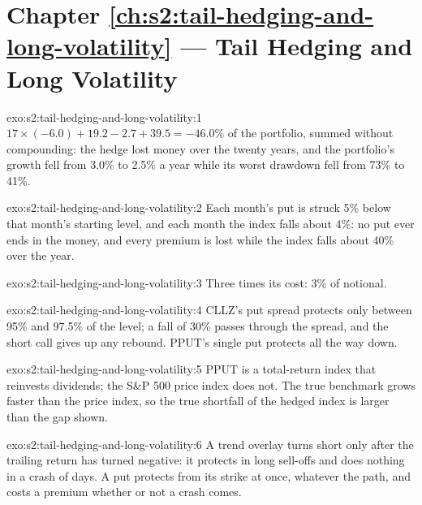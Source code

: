 \section*{Chapter \ref{ch:s2:tail-hedging-and-long-volatility} --- Tail Hedging and Long Volatility}

\begin{solution}{exo:s2:tail-hedging-and-long-volatility:1}
$17 \times (-6.0) + 19.2 - 2.7 + 39.5 = -46.0\%$ of the portfolio, summed without compounding: the hedge lost money over the twenty years, and the
portfolio's growth fell from 3.0\% to 2.5\% a year while its worst drawdown fell from 73\% to 41\%.
\end{solution}

\begin{solution}{exo:s2:tail-hedging-and-long-volatility:2}
Each month's put is struck 5\% below that month's starting level, and each month the index falls about 4\%: no put ever ends in the money, and every
premium is lost while the index falls about 40\% over the year.
\end{solution}

\begin{solution}{exo:s2:tail-hedging-and-long-volatility:3}
Three times its cost: 3\% of notional.
\end{solution}

\begin{solution}{exo:s2:tail-hedging-and-long-volatility:4}
CLLZ's put spread protects only between 95\% and 97.5\% of the level; a fall of 30\% passes through the spread, and the short call gives up any
rebound. PPUT's single put protects all the way down.
\end{solution}

\begin{solution}{exo:s2:tail-hedging-and-long-volatility:5}
PPUT is a total-return index that reinvests dividends; the S\&P 500 price index does not. The true benchmark grows faster than the price index, so
the true shortfall of the hedged index is larger than the gap shown.
\end{solution}

\begin{solution}{exo:s2:tail-hedging-and-long-volatility:6}
A trend overlay turns short only after the trailing return has turned negative: it protects in long sell-offs and does nothing in a crash of days. A
put protects from its strike at once, whatever the path, and costs a premium whether or not a crash comes.
\end{solution}

